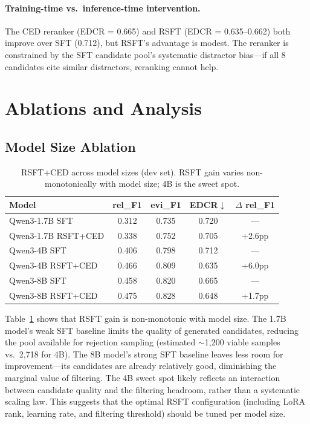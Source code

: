 \documentclass[11pt,a4paper]{article}
\begin{document}
\paragraph{Training-time vs.\ inference-time intervention.}
The CED reranker (EDCR = 0.665) and RSFT (EDCR = 0.635--0.662) both improve over SFT (0.712), but RSFT's advantage is modest.
The reranker is constrained by the SFT candidate pool's systematic distractor bias---if all 8 candidates cite similar distractors, reranking cannot help.

\section{Ablations and Analysis}
\label{sec:ablations}

\subsection{Model Size Ablation}
\label{sec:model_size}

\begin{table}[t]
\centering
\caption{RSFT+CED across model sizes (dev set). RSFT gain varies non-monotonically with model size; 4B is the sweet spot.}
\label{tab:model_size}
\small
\begin{tabular}{lcccc}
\toprule
\textbf{Model} & \textbf{rel\_F1} & \textbf{evi\_F1} & \textbf{EDCR}$\downarrow$ & \textbf{$\Delta$ rel\_F1} \\
\midrule
Qwen3-1.7B SFT       & 0.312 & 0.735 & 0.720 & --- \\
Qwen3-1.7B RSFT+CED  & 0.338 & 0.752 & 0.705 & +2.6pp \\
\midrule
Qwen3-4B SFT         & 0.406 & 0.798 & 0.712 & --- \\
Qwen3-4B RSFT+CED    & 0.466 & 0.809 & 0.635 & +6.0pp \\
\midrule
Qwen3-8B SFT         & 0.458 & 0.820 & 0.665 & --- \\
Qwen3-8B RSFT+CED    & 0.475 & 0.828 & 0.648 & +1.7pp \\
\bottomrule
\end{tabular}
\end{table}

Table~\ref{tab:model_size} shows that RSFT gain is non-monotonic with model size.
The 1.7B model's weak SFT baseline limits the quality of generated candidates, reducing the pool available for rejection sampling (estimated $\sim$1,200 viable samples vs.\ 2,718 for 4B).
The 8B model's strong SFT baseline leaves less room for improvement---its candidates are already relatively good, diminishing the marginal value of filtering.
The 4B sweet spot likely reflects an interaction between candidate quality and the filtering headroom, rather than a systematic scaling law.
This suggests that the optimal RSFT configuration (including LoRA rank, learning rate, and filtering threshold) should be tuned per model size.
\end{document}
